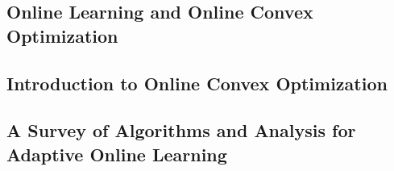 \subsection{Online Learning and Online Convex Optimization}
\label{ssec: online learning and online convex opt}


\subsection{Introduction to Online Convex Optimization}



\subsection{A Survey of Algorithms and Analysis for Adaptive Online Learning}
\label{ssec: survey of aol}


